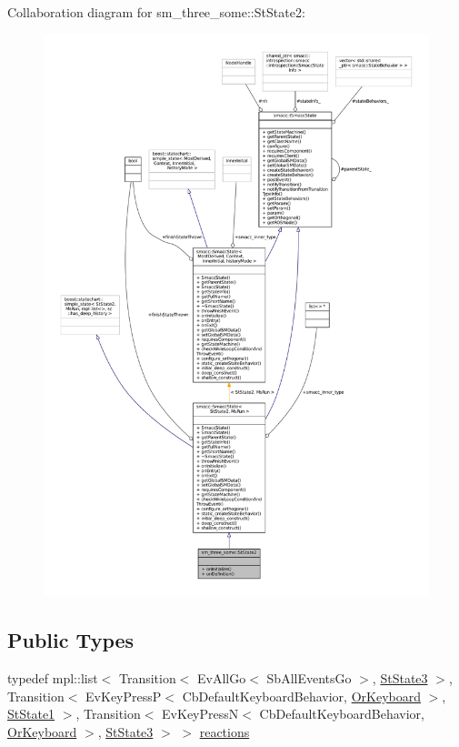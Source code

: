 Collaboration diagram for sm\+\_\+three\+\_\+some\+:\+:St\+State2\+:
\nopagebreak
\begin{figure}[H]
\begin{center}
\leavevmode
\includegraphics[width=350pt]{structsm__three__some_1_1StState2__coll__graph}
\end{center}
\end{figure}
\subsection*{Public Types}
\begin{DoxyCompactItemize}
\item 
typedef mpl\+::list$<$ Transition$<$ Ev\+All\+Go$<$ Sb\+All\+Events\+Go $>$, \hyperlink{structsm__three__some_1_1StState3}{St\+State3} $>$, Transition$<$ Ev\+Key\+PressP$<$ Cb\+Default\+Keyboard\+Behavior, \hyperlink{classsm__three__some_1_1OrKeyboard}{Or\+Keyboard} $>$, \hyperlink{structsm__three__some_1_1StState1}{St\+State1} $>$, Transition$<$ Ev\+Key\+PressN$<$ Cb\+Default\+Keyboard\+Behavior, \hyperlink{classsm__three__some_1_1OrKeyboard}{Or\+Keyboard} $>$, \hyperlink{structsm__three__some_1_1StState3}{St\+State3} $>$ $>$ \hyperlink{structsm__three__some_1_1StState2_a701f64421571c548d1295be157bee13a}{reactions}
\end{DoxyCompactItemize}
